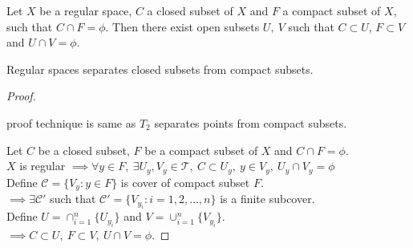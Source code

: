 \begin{proposition}
	Let $X$ be a regular space, $C$ a closed subset of $X$ and $F$ a compact subset of $X$, such that $C \cap F = \phi$.
	Then there exist open subsets $U,\ V$ such that $C \subset U$, $F \subset V$ and $U \cap V = \phi$.
\end{proposition}
\begin{commentary}
	Regular spaces separates closed subsets from compact subsets.
\end{commentary}
\begin{proof}
\begin{commentary}
	proof technique is same as $T_2$ separates points from compact subsets.
\end{commentary}
	Let $C$ be a closed subset, $F$ be a compact subset of $X$ and $C \cap F = \phi$.\\
	$X$ is regular $\implies \forall y \in F,\ \exists U_y,V_y \in \mathcal{T},\ C \subset U_y,\ y \in V_y,\ U_y \cap V_y = \phi$\\
	Define $\mathcal{C} = \{ V_y : y \in F \}$ is cover of compact subset $F$.\\
	$\implies \exists \mathcal{C}'$ such that $\mathcal{C}' = \{ V_{y_i} : i = 1,2,\dots,n \}$ is a finite subcover.\\
	Define $U = \cap_{i = 1}^n \{ U_{y_i} \}$ and $V = \cup_{i = 1}^n \{ V_{y_i} \}$.\\
	$\implies C \subset U,\ F \subset V,\ U \cap V = \phi$.
\end{proof}

